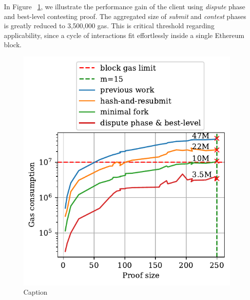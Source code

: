 

In Figure ~\ref{fig:dispute-best-level}, we illustrate the performance gain of
the client using \emph{dispute} phase and best-level contesting proof. The
aggregated size of \emph{submit} and \emph{contest} phases is greatly reduced
to 3,500,000 gas. This is critical threshold regarding applicability, since
a cycle of interactions fit effortlessly inside a single Ethereum block.



\begin{figure}[!h]
    \begin{center}
        \includegraphics[width=1\columnwidth]{figures/dispute-best-level.pdf}
    \end{center}
    \caption{Caption}
    \label{fig:dispute-best-level}
\end{figure}
